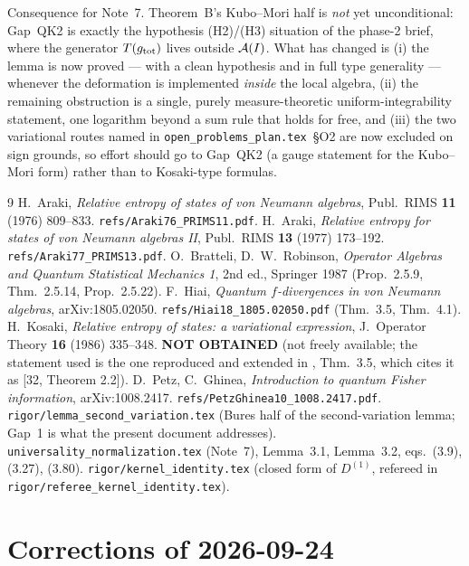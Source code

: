 \documentclass[11pt]{article}
\begin{document}
Consequence for Note~7.  Theorem~B's Kubo--Mori half is \emph{not} yet unconditional: Gap~QK2 is exactly the
hypothesis (H2)/(H3) situation of the phase-2 brief, where the generator $T(g_{\rm tot})$ lives outside
$\mathcal A(I)$.  What has changed is (i) the lemma is now proved --- with a clean hypothesis and in full type
generality --- whenever the deformation is implemented \emph{inside} the local algebra, (ii) the remaining
obstruction is a single, purely measure-theoretic uniform-integrability statement, one logarithm beyond a
sum rule that holds for free, and (iii) the two variational routes named in
\texttt{open\_problems\_plan.tex}~\S O2 are now excluded on sign grounds, so effort should go to Gap~QK2
(a gauge statement for the Kubo--Mori form) rather than to Kosaki-type formulas.

\begin{thebibliography}{9}
 H.~Araki, \emph{Relative entropy of states of von Neumann algebras}, Publ.\ RIMS
 \textbf{11} (1976) 809--833. \texttt{refs/Araki76\_PRIMS11.pdf}.
 H.~Araki, \emph{Relative entropy for states of von Neumann algebras II}, Publ.\ RIMS
 \textbf{13} (1977) 173--192. \texttt{refs/Araki77\_PRIMS13.pdf}.
 O.~Bratteli, D.~W.~Robinson, \emph{Operator Algebras and Quantum Statistical Mechanics 1},
 2nd ed., Springer 1987 (Prop.~2.5.9, Thm.~2.5.14, Prop.~2.5.22).
 F.~Hiai, \emph{Quantum $f$-divergences in von Neumann algebras}, arXiv:1805.02050.
 \texttt{refs/Hiai18\_1805.02050.pdf} (Thm.~3.5, Thm.~4.1).
 H.~Kosaki, \emph{Relative entropy of states: a variational expression}, J.~Operator
 Theory \textbf{16} (1986) 335--348.  \textbf{NOT OBTAINED} (not freely available; the statement used is
 the one reproduced and extended in \cite{Hiai18}, Thm.~3.5, which cites it as [32, Theorem 2.2]).
 D.~Petz, C.~Ghinea, \emph{Introduction to quantum Fisher information}, arXiv:1008.2417.
 \texttt{refs/PetzGhinea10\_1008.2417.pdf}.
 \texttt{rigor/lemma\_second\_variation.tex} (Bures half of the second-variation lemma;
 Gap~1 is what the present document addresses).
 \texttt{universality\_normalization.tex} (Note~7), Lemma~3.1, Lemma~3.2, eqs.~(3.9), (3.27),
 (3.80).
 \texttt{rigor/kernel\_identity.tex} (closed form of $D^{(1)}$, refereed in
 \texttt{rigor/referee\_kernel\_identity.tex}).
\end{thebibliography}

\section{Corrections of 2026-09-24}\label{corr0924:sec}
\end{document}
